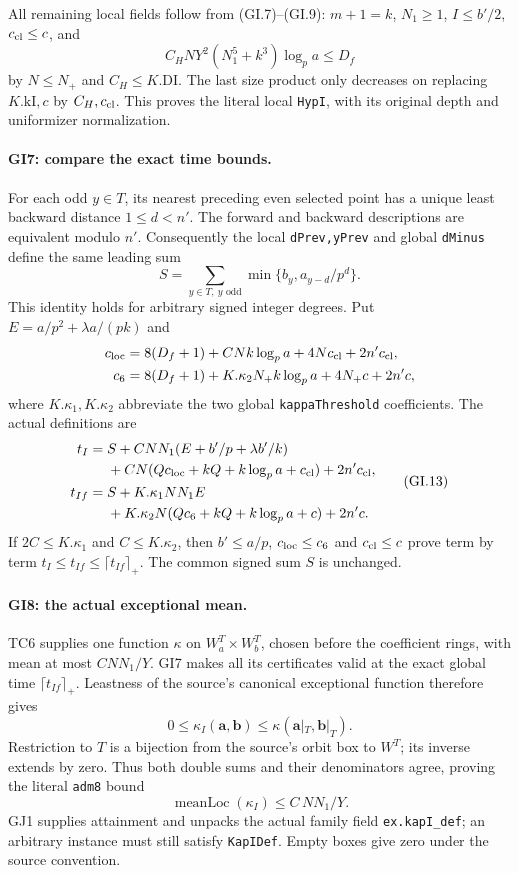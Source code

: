 All remaining local fields follow from (GI.7)--(GI.9):
$m+1=k$, $N_1\ge1$, $I\le b'/2$, $c_{\rm cl}\le c$,
and
\[
 C_HNY^2(N_1^5+k^3)\log_p a\le D_f
\]
by $N\le N_+$ and $C_H\le K.\mathrm{DI}$.
The last size product only decreases on replacing
$K.\mathrm{kI},c$ by $C_H,c_{\rm cl}$. This proves the
literal local \texttt{HypI}, with its original depth and
uniformizer normalization.

\paragraph{GI7: compare the exact time bounds.}
For each odd $y\in T$, its nearest preceding even selected
point has a unique least backward distance $1\le d<n'$.
The forward and backward descriptions are equivalent modulo
$n'$. Consequently the local \texttt{dPrev,yPrev} and global
\texttt{dMinus} define the same leading sum
\[
 S=\sum_{y\in T,\ y\text{ odd}}
        \min\{b_y,a_{y-d}/p^d\}.
\]
This identity holds for arbitrary signed integer degrees.
Put $E=a/p^2+\lambda a/(pk)$ and
\[
\begin{aligned}
 c_{\rm loc}&=8(D_f+1)+CNk\log_p a+4Nc_{\rm cl}+2n'c_{\rm cl},\\
 c_6&=8(D_f+1)+K.\kappa_2N_+k\log_p a+4N_+c+2n'c,
\end{aligned}
\]
where $K.\kappa_1,K.\kappa_2$ abbreviate the two global
\texttt{kappaThreshold} coefficients. The actual definitions are
\[
\begin{aligned}
 t_I={}&S+CNN_1(E+b'/p+\lambda b'/k)\\
       &+CN(Qc_{\rm loc}+kQ+k\log_p a+c_{\rm cl})+2n'c_{\rm cl},\\
 t_{If}={}&S+K.\kappa_1NN_1E\\
       &+K.\kappa_2N(Qc_6+kQ+k\log_p a+c)+2n'c.
\end{aligned}                                                    \tag{GI.13}
\]
If $2C\le K.\kappa_1$ and $C\le K.\kappa_2$, then
$b'\le a/p$, $c_{\rm loc}\le c_6$ and $c_{\rm cl}\le c$
prove term by term
$t_I\le t_{If}\le\lceil t_{If}\rceil_+$.
The common signed sum $S$ is unchanged.

\paragraph{GI8: the actual exceptional mean.}
TC6 supplies one function $\kappa$ on $W_a^T\times W_b^T$,
chosen before the coefficient rings, with mean at most
$CNN_1/Y$. GI7 makes all its certificates valid at the exact
global time $\lceil t_{If}\rceil_+$. Leastness of the source's
canonical exceptional function therefore gives
\[
 0\le\kappa_I(\mathbf a,\mathbf b)
       \le\kappa(\mathbf a|_T,\mathbf b|_T).
\]
Restriction to $T$ is a bijection from the source's orbit box
to $W^T$; its inverse extends by zero. Thus both double sums
and their denominators agree, proving the literal
\texttt{adm8} bound
\[
 \operatorname{meanLoc}(\kappa_I)\le C\,NN_1/Y.           \tag{GI.14}
\]
GJ1 supplies attainment and unpacks the actual family field
\texttt{ex.kapI\_def}; an arbitrary instance must still satisfy
\texttt{KapIDef}. Empty boxes give zero under the source convention.

